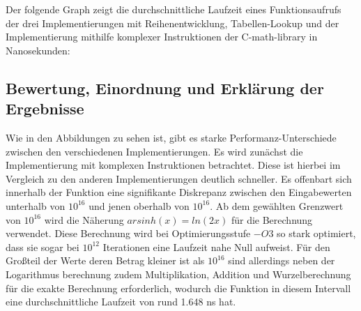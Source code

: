 \documentclass[course=erap] {aspdoc}
\begin{document}
    Der folgende Graph zeigt die durchschnittliche Laufzeit eines Funktionsaufrufs der drei Implementierungen mit Reihenentwicklung, Tabellen-Lookup und der Implementierung mithilfe komplexer Instruktionen der C-math-library in Nanosekunden:
    
 
     \subsection{Bewertung, Einordnung und Erklärung der Ergebnisse}\label{subsec:bewertung-einordnung-und-erklarung-der-ergebnisse}

     Wie in den Abbildungen zu sehen ist, gibt es starke Performanz-Unterschiede zwischen den verschiedenen Implementierungen. 
     Es wird zunächst die Implementierung mit komplexen Instruktionen betrachtet.
     Diese ist hierbei im Vergleich zu den anderen Implementierungen deutlich schneller. 
     Es offenbart sich innerhalb der Funktion eine signifikante Diskrepanz zwischen den Eingabewerten unterhalb von $10^{16}$ und jenen oberhalb von $10^{16}$.
    Ab dem gewählten Grenzwert von $10^{16}$ wird die Näherung $arsinh(x) = ln(2x)$ für die Berechnung verwendet. 
    Diese Berechnung wird bei Optimierungsstufe $-O3$ so stark optimiert, dass sie sogar bei $10^{12}$ Iterationen eine Laufzeit nahe Null aufweist.
    Für den Großteil der Werte deren Betrag kleiner ist als $10^{16}$ sind allerdings neben der Logarithmus berechnung zudem Multiplikation, Addition und Wurzelberechnung für die exakte Berechnung erforderlich, wodurch die Funktion in diesem Intervall eine durchschnittliche Laufzeit von rund 1.648 ns hat.
\end{document}

